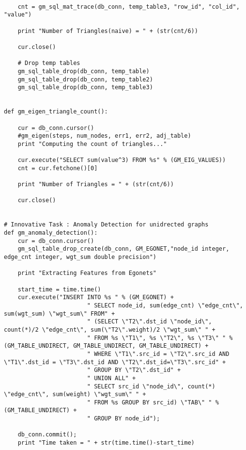 \documentclass[11pt]{article}
\begin{document}
\begin{lstlisting}
    
    cnt = gm_sql_mat_trace(db_conn, temp_table3, "row_id", "col_id", "value")

    print "Number of Triangles(naive) = " + (str(cnt/6))
    
    cur.close()
    
    # Drop temp tables
    gm_sql_table_drop(db_conn, temp_table)
    gm_sql_table_drop(db_conn, temp_table2)
    gm_sql_table_drop(db_conn, temp_table3)
    

def gm_eigen_triangle_count():
   
    cur = db_conn.cursor()
    #gm_eigen(steps, num_nodes, err1, err2, adj_table)
    print "Computing the count of triangles..."    
    
    cur.execute("SELECT sum(value^3) FROM %s" % (GM_EIG_VALUES))
    cnt = cur.fetchone()[0]
    
    print "Number of Triangles = " + (str(cnt/6))
    
    cur.close()


# Innovative Task : Anomaly Detection for unidrected graphs
def gm_anomaly_detection():
    cur = db_conn.cursor()
    gm_sql_table_drop_create(db_conn, GM_EGONET,"node_id integer, edge_cnt integer, wgt_sum double precision")
    
    print "Extracting Features from Egonets"
    
    start_time = time.time()
    cur.execute("INSERT INTO %s " % (GM_EGONET) +
                        " SELECT node_id, sum(edge_cnt) \"edge_cnt\", sum(wgt_sum) \"wgt_sum\" FROM" + 
                        " (SELECT \"T2\".dst_id \"node_id\", count(*)/2 \"edge_cnt\", sum(\"T2\".weight)/2 \"wgt_sum\" " +
                        " FROM %s \"T1\", %s \"T2\", %s \"T3\" " % (GM_TABLE_UNDIRECT, GM_TABLE_UNDIRECT, GM_TABLE_UNDIRECT) +
                        " WHERE \"T1\".src_id = \"T2\".src_id AND \"T1\".dst_id = \"T3\".dst_id AND \"T2\".dst_id=\"T3\".src_id" +
                        " GROUP BY \"T2\".dst_id" +
                        " UNION ALL" +
                        " SELECT src_id \"node_id\", count(*) \"edge_cnt\", sum(weight) \"wgt_sum\" " +
                        " FROM %s GROUP BY src_id) \"TAB\" " % (GM_TABLE_UNDIRECT) +
                        " GROUP BY node_id");
                        
    db_conn.commit();
    print "Time taken = " + str(time.time()-start_time)     
    



\end{lstlisting}
\end{document}
